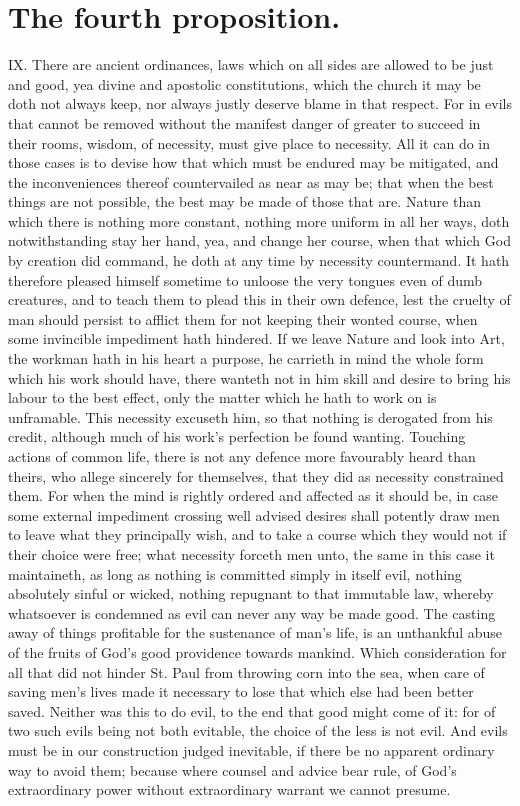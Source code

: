 \section*{The fourth proposition.}
IX. There are ancient ordinances, laws which on all sides are allowed to be just and good, yea divine and apostolic constitutions, which the church it may be doth not always keep, nor always justly deserve blame in that respect. For in evils that cannot be removed without the manifest danger of greater to succeed in their rooms, wisdom, of necessity, must give place to necessity. All it can do in those cases is to devise how that which must be endured may be mitigated, and the inconveniences thereof countervailed as near as may be; that when the best things are not possible, the best may be made of those that are.
Nature than which there is nothing more constant, nothing more uniform in all her ways, doth notwithstanding stay her hand, yea, and change her course, when that which God by creation did command, he doth at any time by necessity countermand. It hath therefore pleased himself sometime to unloose the very tongues even of dumb creatures, and to teach them to plead this in their own defence, lest the cruelty of man should persist to afflict them for not keeping their wonted course, when some invincible impediment hath hindered.
If we leave Nature and look into Art, the workman hath in his heart a purpose, he carrieth in mind the whole form which his work should have, there wanteth not in him skill and desire to bring his labour to the best effect, only the matter which he hath to work on is unframable. This necessity excuseth him, so that nothing is derogated from his credit, although much of his work’s perfection be found wanting.
Touching actions of common life, there is not any defence more favourably heard than theirs, who allege sincerely for  themselves, that they did as necessity constrained them. For when the mind is rightly ordered and affected as it should be, in case some external impediment crossing well advised desires shall potently draw men to leave what they principally wish, and to take a course which they would not if their choice were free; what necessity forceth men unto, the same in this case it maintaineth, as long as nothing is committed simply in itself evil, nothing absolutely sinful or wicked, nothing repugnant to that immutable law, whereby whatsoever is condemned as evil can never any way be made good. The casting away of things profitable for the sustenance of man’s life, is an unthankful abuse of the fruits of God’s good providence towards mankind. Which consideration for all that did not hinder St. Paul from throwing corn into the sea, when care of saving men’s lives made it necessary to lose that which else had been better saved. Neither was this to do evil, to the end that good might come of it: for of two such evils being not both evitable, the choice of the less is not evil. And evils must be in our construction judged inevitable, if there be no apparent ordinary way to avoid them; because where counsel and advice bear rule, of God’s extraordinary power without extraordinary warrant we cannot presume.
